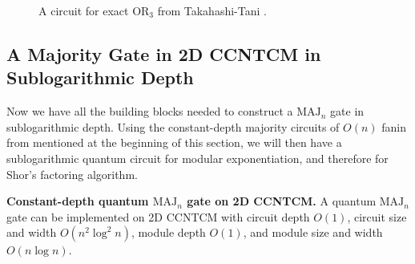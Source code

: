 \begin{figure}[hbt!]
\caption{A circuit for exact $\text{OR}_3$ from Takahashi-Tani \cite{Takahashi2011}.}
\label{fig:exact-or}
\end{figure}

\subsection{A Majority Gate in \textsf{2D CCNTCM} in Sublogarithmic Depth}
\label{subsec:maj-gate}

Now we have all the building blocks needed to construct a
$\text{MAJ}_n$ gate in sublogarithmic depth. Using the constant-depth
majority circuits of $O(n)$ fanin from \cite{Yeh1996} mentioned at
the beginning of this section, we will then have a sublogarithmic
quantum circuit for modular exponentiation, and therefore for
Shor's factoring algorithm.

\begin{theorem}{\textbf{Constant-depth quantum $\text{MAJ}_n$ gate on \textsf{2D CCNTCM}.}}
A quantum $\text{MAJ}_n$ gate can be implemented on \textsf{2D CCNTCM} with
circuit depth $O(1)$, circuit size and width $O(n^2\log^2 n)$,
module depth $O(1)$, and module size and width $O(n \log n)$.
\label{thm:maj-gate}
\end{theorem}


